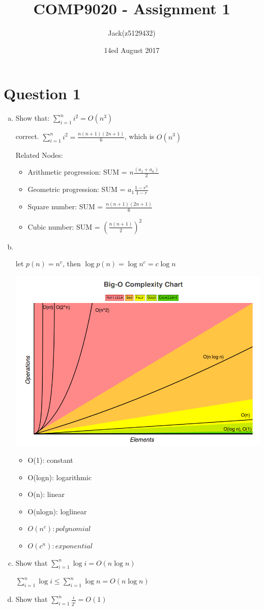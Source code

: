 \documentclass[11pt, a4paper]{article}
\begin{document}
	\title{COMP9020 - Assignment 1}
	\author{Jack(z5129432)}
	\date{ 14ed August 2017 }
	\maketitle
	\graphicspath{{/}}

	\section*{Question 1}
	\begin{enumerate}[(a)]
		\item Show that: $\sum_{i=1}^{n}{i^2}=O(n^3)$\
		
		correct. $\sum_{i=1}^{n}{i^2} = \frac{n(n+1)(2n+1)}{6}$, which is $O(n^3)$\
		
		Related Nodes:\
		\begin{itemize}
			\item Arithmetic progression: SUM = $n\frac{(a_1 + a_n)}{2}$
			\item Geometric progression: SUM = $a_1\frac{1-r^n}{1-r}$
			\item Square number: SUM = $\frac{n(n+1)(2n+1)}{6}$
			\item Cubic number: SUM = $(\frac{n(n+1)}{2})^2$
		\end{itemize}
				
		\item\
		
		let $p(n) = n^c$, then $\log{p(n)} = \log{n^c} = c\log{n}$

		\includegraphics[scale=0.5]{bigo.png}
		\begin{itemize}
			\item O(1): constant
			\item O(logn): logarithmic
			\item O(n): linear
			\item O(nlogn): loglinear
			\item $O(n^c): polynomial$
			\item $O(c^n): exponential$
		\end{itemize}

		\item Show that $\sum_{i=1}^{n}{\log{i}} = O(n\log{n})$\
		
		$\sum_{i=1}^{n}{\log{i}} \leq \sum_{i=1}^{n}{\log{n}} = O(n\log{n})$

		\item Show that $\sum_{i=1}^{n}{\frac{i}{2^i}} = O(1)$\
		

	\end{enumerate}
\end{document}

